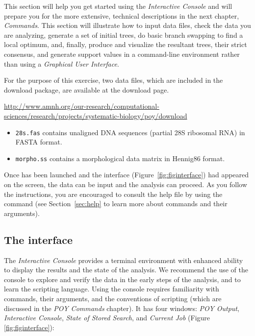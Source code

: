 {This section will help you get started using the \poy \emph{Interactive Console} and will prepare you for the
more extensive, technical descriptions in the next chapter, \emph{\poy Commands}. %
This section will illustrate how to input data files, check the data you are analyzing, generate a set of initial trees, do basic branch 
swapping to find a local optimum, and, finally, produce and visualize the resultant trees, their strict consensus, and generate support 
values in a command-line environment rather than using a \emph{Graphical User Interface}. 

For the purpose of this exercise, two data files, which are included in the download package, are available at the \poy download page.\\
\begin{center}
\url{http://www.amnh.org/our-research/computational-sciences/research/projects/systematic-biology/poy/download}
\end{center}

\begin{itemize}
\item {\texttt{28s.fas} contains unaligned DNA sequences (partial 28S ribosomal RNA) 
in FASTA format.~\cite{pearson1988}}
\item {\texttt{morpho.ss} contains a morphological data matrix in Hennig86 format.~\cite{farris1988}}
\end{itemize}

Once \poy has been launched and the interface (Figure~\ref{fig:figinterface}) had appeared on the screen, the data can 
be input and the analysis can proceed. As you follow the instructions, you are encouraged to consult the help file by using 
the command  (see Section~\ref{sec:help} to learn more about \poy commands and their arguments).

\subsection{The interface}

The \emph{Interactive Console} provides a terminal environment with enhanced ability to display the results and the state 
of the analysis. We recommend the use of the console to explore and verify the data in the early steps of the analysis, and 
to learn the scripting language. Using the console requires familiarity with \poy commands, their arguments, and the 
conventions of \poy scripting (which are discussed in the \emph{POY Commands} chapter). It has four windows: 
\emph{POY Output}, \emph{Interactive Console}, \emph{State of Stored Search}, and \emph{Current Job} (Figure \ref{fig:figinterface}):

}
